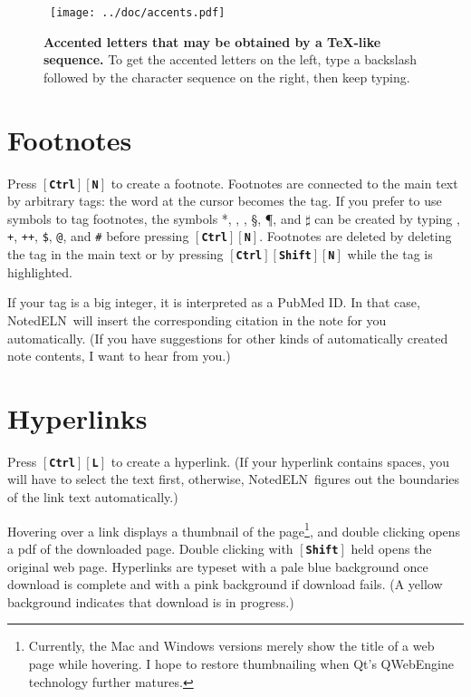 \documentclass[11pt]{report}
\def\keystroke#1{$\left[\right.\!${\tt\bfseries #1}$\!\left.\right]$}
\def\key#1{\keystroke{#1}}
\def\keycombo#1#2{\keystroke{#1}\keystroke{#2}}
\def\keycontrol#1{\keycombo{Ctrl}{#1}}
\def\controlshift#1{\keystroke{Ctrl}\keystroke{Shift}\keystroke{#1}}
\newcommand{\NotedELN}{NotedELN} %
\begin{document}
\begin{figure}
\noindent~\hfill\texttt{[image: ../doc/accents.pdf]}\vspace{-7pt}\hfill~

\caption{{\bf Accented letters that may be obtained by a TeX-like sequence.} To
  get the accented letters on the left, type a backslash followed by the character sequence on the
  right, then keep typing.}\label{fig:accents}
\end{figure}


\section{Footnotes}

Press \keycontrol{N} to create a footnote. Footnotes are connected to
the main text by arbitrary tags: the word at the cursor becomes the
tag.  If you prefer to use symbols to tag footnotes, the symbols *,
\dag, \ddag, \S, \P, and $\sharp$ can be created by typing {\tt *},
    {\tt +}, {\tt ++}, {\tt\$}, {\tt @}, and {\tt \#} before pressing
    \keycontrol{N}. Footnotes are deleted by deleting the tag in the
    main text or by pressing \controlshift{N} while the tag is
    highlighted.

If your tag is a big integer, it is interpreted as a PubMed ID. In
that case, \NotedELN\ will insert the corresponding citation in the note for
you automatically. (If you have suggestions for other kinds of
automatically created note contents, I want to hear from you.)

\section{Hyperlinks}

Press \keycontrol{L} to create a hyperlink. (If your hyperlink
contains spaces, you will have to select the text first, otherwise,
\NotedELN\ figures out the boundaries of the link text automatically.)

Hovering over a link displays a thumbnail of the
page\footnote{Currently, the Mac and Windows versions merely show the
  title of a web page while hovering. I hope to restore thumbnailing
  when Qt's QWebEngine technology further matures.}, and double
clicking opens a pdf of the downloaded page. Double clicking with
\key{Shift} held opens the original web page. Hyperlinks are typeset
with a pale blue background once download is complete and with a pink
background if download fails. (A yellow background indicates that
download is in progress.)
\end{document}
